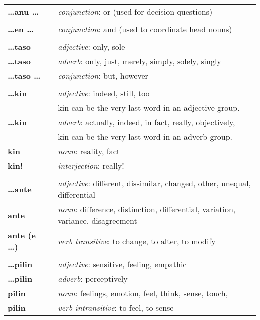 \begin{supertabular}{p{2,5cm}|ll}
\textbf{\dots anu \dots} && \textit{conjunction}: or (used for decision questions) \\ %
 && \\ %
\textbf{\dots en \dots} && \textit{conjunction}: and (used to coordinate head nouns) \\ %
 && \\ %
\textbf{\dots taso} && \textit{adjective}: only, sole \\ %
\textbf{\dots taso} && \textit{adverb}: only, just, merely, simply, solely, singly \\ %
\textbf{\dots taso \dots} && \textit{conjunction}: but, however \\ %
 && \\ %
\textbf{\dots kin} && \textit{adjective}: indeed, still, too \\ && kin can be the very last word in an adjective group. \\ %
\textbf{\dots kin} && \textit{adverb}: actually, indeed, in fact, really, objectively, \\ && kin can be the very last word in an adverb group. \\%
\textbf{kin} && \textit{noun}: reality, fact \\  %
\textbf{kin!} && \textit{interjection}: really! \\ %
 && \\ %
\textbf{\dots ante} && \textit{adjective}: different, dissimilar, changed, other, unequal, differential \\ %
\textbf{ante} && \textit{noun}: difference, distinction, differential, variation, variance, disagreement \\ %
\textbf{ante (e \dots)} && \textit{verb transitive}: to change, to alter, to modify \\ %
 && \\ %
\textbf{\dots pilin} && \textit{adjective}: sensitive, feeling, empathic \\ %
\textbf{\dots pilin} && \textit{adverb}: perceptively \\ %
\textbf{pilin} && \textit{noun}: feelings, emotion, feel, think, sense, touch, \\ %
\textbf{pilin} && \textit{verb intransitive}: to feel, to sense \\ %

\end{supertabular}
